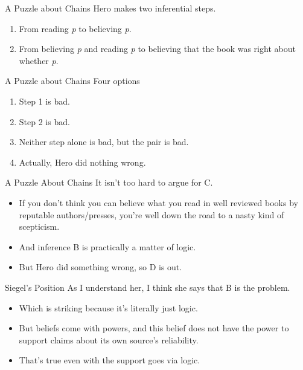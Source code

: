 \documentclass[
  17pt,
  letterpaper,
  ignorenonframetext,
  aspectratio=169,
  handout,
  xcolor={dvipsnames}]{beamer}
\providecommand{\tightlist}{%
  \setlength{\itemsep}{0pt}\setlength{\parskip}{0pt}}\usepackage{longtable,booktabs,array}
\begin{document}
\begin{frame}{A Puzzle about Chains}
\protect\hypertarget{a-puzzle-about-chains}{}
Hero makes two inferential steps.

\begin{enumerate}[<+->]
\tightlist
\item
  From reading \emph{p} to believing \emph{p}.
\item
  From believing \emph{p} and reading \emph{p} to believing that the
  book was right about whether \emph{p}.
\end{enumerate}
\end{frame}

\begin{frame}{A Puzzle about Chains}
\protect\hypertarget{a-puzzle-about-chains-1}{}
Four options

\begin{enumerate}[<+->]
[A.]
\tightlist
\item
  Step 1 is bad.
\item
  Step 2 is bad.
\item
  Neither step alone is bad, but the pair is bad.
\item
  Actually, Hero did nothing wrong.
\end{enumerate}
\end{frame}

\begin{frame}{A Puzzle About Chains}
\protect\hypertarget{a-puzzle-about-chains-2}{}
It isn't too hard to argue for C.

\begin{itemize}[<+->]
\tightlist
\item
  If you don't think you can believe what you read in well reviewed
  books by reputable authors/presses, you're well down the road to a
  nasty kind of scepticism.
\item
  And inference B is practically a matter of logic.
\item
  But Hero did something wrong, so D is out.
\end{itemize}
\end{frame}

\begin{frame}{Siegel's Position}
\protect\hypertarget{siegels-position}{}
As I understand her, I think she says that B is the problem.

\begin{itemize}[<+->]
\tightlist
\item
  Which is striking because it's literally just logic.
\item
  But beliefs come with powers, and this belief does not have the power
  to support claims about its own source's reliability.
\item
  That's true even with the support goes via logic.
\end{itemize}
\end{frame}
\end{document}
